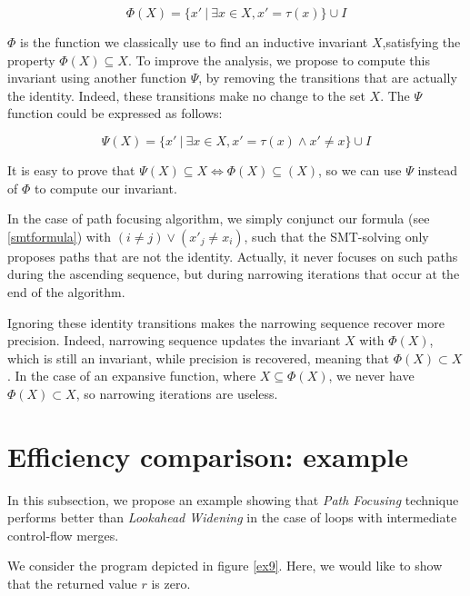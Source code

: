 \documentclass[a4paper,english,titlepage,11pt]{report}
\begin{document}
	$$\Phi(X) = \{ x'\ |\ \exists x \in X, x' = \tau(x)\} \cup I$$

	$\Phi$ is the function we classically use to find an inductive invariant
	$X$,satisfying the property $\Phi(X) \subseteq X$. To improve the analysis,
	we propose to compute this invariant using another function $\Psi$, by
	removing the transitions that are actually the identity. Indeed, these
	transitions make no change to the set $X$.
	The $\Psi$ function could be expressed as follows:

	$$\Psi(X) = \{ x'\ |\ \exists x \in X, x' = \tau(x) \wedge x' \neq x\}
	\cup I$$

	It is easy to prove that $\Psi(X) \subseteq X \Leftrightarrow \Phi(X)
	\subseteq(X)$, so we can use $\Psi$ instead of $\Phi$ to compute our
	invariant.

	In the case of path focusing algorithm, we simply conjunct our formula
	(see \ref{smtformula}) with
	$(i \neq j) \vee (x'_j \neq x_i)$, such that the SMT-solving only proposes
	paths that are not the identity. Actually, it never focuses on such paths
	during the ascending sequence, but during narrowing iterations that occur 
	at the end of the algorithm.

	Ignoring these identity transitions makes the narrowing sequence recover
	more precision.
	Indeed, narrowing sequence updates the invariant $X$ with $\Phi(X)$, which
	is still an invariant, while precision is recovered, meaning that $\Phi(X)
	\subset X$. In the case of an expansive function, where $X \subseteq
	\Phi(X)$, we never have $\Phi(X) \subset X$, so narrowing iterations are
	useless.

	\section{Efficiency comparison: example}

In this subsection, we propose an example showing that \emph{Path Focusing}
technique performs better than \emph{Lookahead Widening} in the case of loops
with intermediate control-flow merges.

We consider the program depicted in figure \ref{ex9}.
Here, we would like to show that the returned value $r$ is zero.
\end{document}
